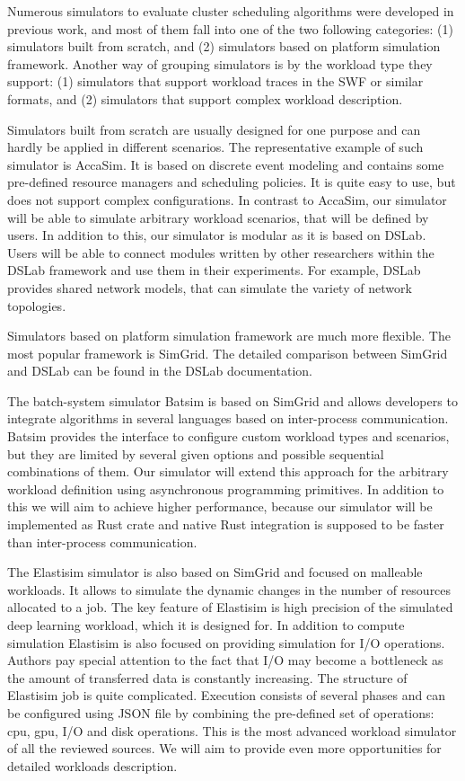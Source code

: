 \documentclass[a4paper,10pt]{article}
\begin{document}
\begin{multicols*}{2}
Numerous simulators to evaluate cluster scheduling algorithms were developed in
previous work, and most of them fall into one of the two following categories: (1) simulators built from scratch, and (2) simulators based on platform simulation framework. Another way of grouping simulators is by the workload type they support: (1) simulators that support workload traces in the SWF or similar formats, and (2) simulators that support complex workload description.


Simulators built from scratch are usually designed for one purpose and can hardly be applied in different scenarios. The representative example of such simulator is AccaSim\cite{accasim-article}. It is based on discrete event modeling and contains some pre-defined resource managers and scheduling policies. It is quite easy to use, but does not support complex configurations. In contrast to AccaSim, our simulator will be able to simulate arbitrary workload scenarios, that will be defined by users. In addition to this, our simulator is modular as it is based on DSLab. Users will be able to connect modules written by other researchers within the DSLab framework and use them in their experiments. For example, DSLab provides shared network models, that can simulate the variety of network topologies. 

Simulators based on platform simulation framework are much more flexible. The most popular framework is SimGrid\cite{simgrid-article}. The detailed comparison between SimGrid and DSLab can be found in the DSLab documentation\cite{dslab-analog-cmp}.


The batch-system simulator Batsim\cite{batsim-article} is based on SimGrid and allows developers to integrate algorithms in several languages based on inter-process communication. Batsim provides the interface to configure custom workload types and scenarios, but they are limited by several given options and possible sequential combinations of them. Our simulator will extend this approach for the arbitrary workload definition using asynchronous programming primitives. In addition to this we will aim to achieve higher performance, because our simulator will be implemented as Rust crate and native Rust integration is supposed to be faster than inter-process communication.

The Elastisim\cite{elastisim-article} simulator is also based on SimGrid and focused on malleable workloads. It allows to simulate the dynamic changes in the number of resources allocated to a job. The key feature of Elastisim is high precision of the simulated deep learning workload, which it is designed for. In addition to compute simulation Elastisim is also focused on providing simulation for I/O operations. Authors pay special attention to the fact that I/O may become a bottleneck as the amount of transferred data is constantly increasing. The structure of Elastisim job is quite complicated. Execution consists of several phases and can be configured using JSON file by combining the pre-defined set of operations: cpu, gpu, I/O and disk operations. This is the most advanced workload simulator of all the reviewed sources. We will aim to provide even more opportunities for detailed workloads description.


\end{multicols*}
\end{document}
